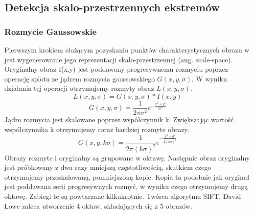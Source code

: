 \subsection{Detekcja skalo-przestrzennych ekstremów}
\subsubsection{Rozmycie Gaussowskie}
Pierwszym krokiem służącym pozyskaniu punktów charakterystycznych obrazu w jest wygenerowanie jego reprezentacji skalo-przestrzennej (ang. scale-space).  Oryginalny obraz I(x,y) jest poddawany progresywnemu rozmyciu poprzez operację splotu ze jądrem rozmycia gaussowskiego $G(x,y,\sigma)$. W wyniku działania tej operacji otrzymujemy rozmyty obraz $L(x,y,\sigma)$. 
\begin{equation}
L(x,y,\sigma) = G(x,y,\sigma) * I(x,y)
\end{equation}
\begin{equation}
G(x,y,\sigma) = \frac{1}{2\pi\sigma^2}e^{-\frac{x^2+y^2}{2\sigma^2}}
\end{equation}
Jądro rozmycia jest skalowane poprzez współczynnik k. Zwiększając wartość współczynnika k otrzymujemy coraz bardziej rozmyte obrazy. 
\begin{equation}
G(x,y,k\sigma) = \frac{1}{2\pi(k\sigma)^2}e^{-\frac{x^2+y^2}{2(k\sigma)^2}}
\end{equation}
Obrazy rozmyte i oryginalny są grupowane w oktawę. Następnie obraz oryginalny jest próbkowany z dwa razy mniejszą częstotliwością, skutkiem czego  otrzymujemy przeskalowaną, pomniejszoną kopie. Kopia ta podobnie jak oryginał jest poddawana serii progresywnych rozmyć, w wyniku czego otrzymujemy drugą oktawę. Zabiegi te są powtarzane kilkukrotnie. Twórca algorytmu SIFT, David Lowe zaleca utworzenie 4 oktaw, składających się z 5 obrazów.

